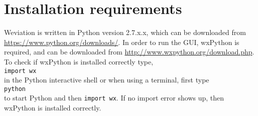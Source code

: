 \section{Installation requirements}
\label{sec:installation}
Weviation is written in Python version 2.7.x.x, which can be downloaded from \url{https://www.python.org/downloads/}.
In order to run the GUI, wxPython is required, and can be downloaded from \url{http://www.wxpython.org/download.php}. To check if wxPython is installed correctly type,\\
\indent \texttt{import wx}\\
\noindent in the Python interactive shell or when using a terminal, first type\\
\indent \texttt{python}\\
\noindent to start Python and then \texttt{import wx}.
If no import error shows up, then wxPython is installed correctly.
